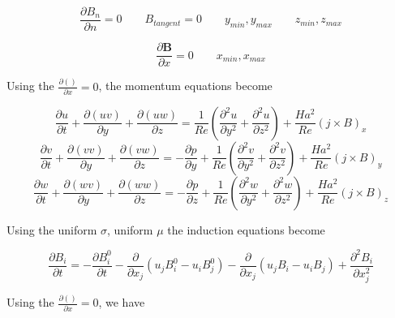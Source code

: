 \documentclass[11pt]{article}
\begin{document}
\begin{equation}
	\frac{\partial B_{n}}{\partial n} = 0
	\qquad
	B_{tangent} = 0
	\qquad
	y_{min}, y_{max}
	\qquad
	z_{min}, z_{max}
\end{equation}

\begin{equation}
	\frac{\partial \pmb{B}}{\partial x} = 0
	\qquad
	x_{min}, x_{max}
\end{equation}

Using the $\frac{\partial ()}{\partial x} = 0$, the momentum equations become

\begin{equation}
	\frac{\partial u}{\partial t} 
	+ \frac{\partial (u v)}{\partial y}
	+ \frac{\partial (u w)}{\partial z}
	= 
	\frac{1}{Re}
	\left(
	\frac{\partial^2 u}{\partial y^2}
	+\frac{\partial^2 u}{\partial z^2}
	\right)
	+ \frac{Ha^2}{Re}
	(j \times B)_x
\end{equation}
\begin{equation}
	\frac{\partial v}{\partial t} 
	+ \frac{\partial (v v)}{\partial y}
	+ \frac{\partial (v w)}{\partial z}
	= 
	- \frac{\partial p}{\partial y}
	+ \frac{1}{Re}
	\left(
	\frac{\partial^2 v}{\partial y^2}
	+\frac{\partial^2 v}{\partial z^2}
	\right)
	+ \frac{Ha^2}{Re}
	(j \times B)_y
\end{equation}
\begin{equation}
	\frac{\partial w}{\partial t} 
	+ \frac{\partial (w v)}{\partial y}
	+ \frac{\partial (w w)}{\partial z}
	= 
	- \frac{\partial p}{\partial z}
	+ \frac{1}{Re}
	\left(
	\frac{\partial^2 w}{\partial y^2}
	+\frac{\partial^2 w}{\partial z^2}
	\right)
	+ \frac{Ha^2}{Re}
	(j \times B)_z
\end{equation}

Using the uniform $\sigma$, uniform $\mu$ the induction equations become

\begin{equation}
	\frac{\partial B_i}{\partial t} 
	=
	- \frac{\partial B_i^0}{\partial t} 
	- \frac{\partial}{\partial x_j} (u_j B_i^0 - u_i B_j^0) 
	- \frac{\partial}{\partial x_j} (u_j B_i - u_i B_j) 
	+ \frac{\partial^2 B_i}{\partial x_j^2}
\end{equation}

Using the $\frac{\partial ()}{\partial x} = 0$, we have
\end{document}
